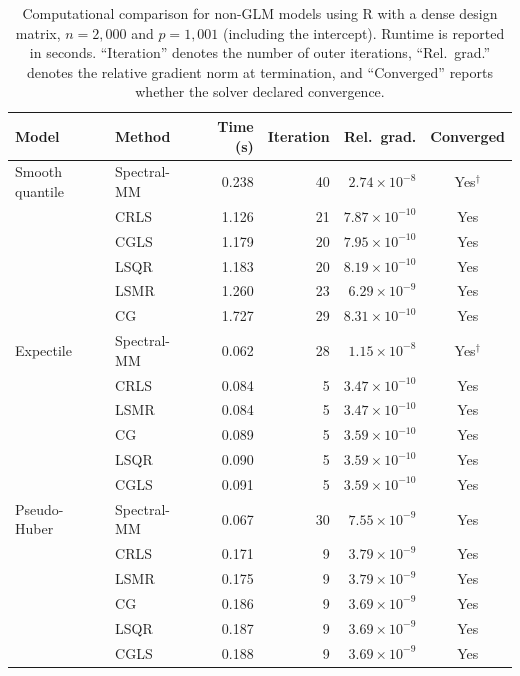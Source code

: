 \clearpage

\begin{table}[htbp]
\centering
\small
\setlength{\tabcolsep}{4pt}
\caption{
Computational comparison for non-GLM models using R with a dense design matrix,
$n=2{,}000$ and $p=1{,}001$ (including the intercept).
Runtime is reported in seconds. ``Iteration\textquotedblright{} denotes the number of outer iterations,
``Rel.\ grad.\textquotedblright{} denotes the relative gradient norm at termination, and
``Converged\textquotedblright{} reports whether the solver declared convergence.}
\label{tab:r-nonglm-comparison-dense}
\begin{tabular}{llrrrc}
\toprule
Model & Method & Time (s) & Iteration & Rel.\ grad. & Converged \\
\midrule

Smooth quantile
& Spectral-MM & 0.238 & 40 & $2.74\times10^{-8}$ & Yes$^{\dagger}$ \\
& CRLS & 1.126 & 21 & $7.87\times10^{-10}$ & Yes \\
& CGLS & 1.179 & 20 & $7.95\times10^{-10}$ & Yes \\
& LSQR & 1.183 & 20 & $8.19\times10^{-10}$ & Yes \\
& LSMR & 1.260 & 23 & $6.29\times10^{-9}$ & Yes \\
& CG & 1.727 & 29 & $8.31\times10^{-10}$ & Yes \\
\midrule

Expectile
& Spectral-MM & 0.062 & 28 & $1.15\times10^{-8}$ & Yes$^{\dagger}$ \\
& CRLS & 0.084 & 5 & $3.47\times10^{-10}$ & Yes \\
& LSMR & 0.084 & 5 & $3.47\times10^{-10}$ & Yes \\
& CG & 0.089 & 5 & $3.59\times10^{-10}$ & Yes \\
& LSQR & 0.090 & 5 & $3.59\times10^{-10}$ & Yes \\
& CGLS & 0.091 & 5 & $3.59\times10^{-10}$ & Yes \\
\midrule

Pseudo-Huber
& Spectral-MM & 0.067 & 30 & $7.55\times10^{-9}$ & Yes \\
& CRLS & 0.171 & 9 & $3.79\times10^{-9}$ & Yes \\
& LSMR & 0.175 & 9 & $3.79\times10^{-9}$ & Yes \\
& CG & 0.186 & 9 & $3.69\times10^{-9}$ & Yes \\
& LSQR & 0.187 & 9 & $3.69\times10^{-9}$ & Yes \\
& CGLS & 0.188 & 9 & $3.69\times10^{-9}$ & Yes \\
\midrule


\end{tabular}
\end{table}
